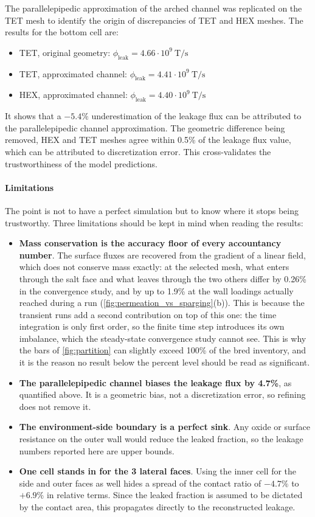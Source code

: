 \documentclass[a4paper,11pt,oneside]{report}
\begin{document}
The parallelepipedic approximation of the arched channel was replicated on the TET mesh to identify the origin of discrepancies of TET and HEX meshes. The results for the bottom cell are:
\begin{itemize}
    \item TET, original geometry: $\phi_\mathrm{leak}=4.66 \cdot10^9 \ \mathrm{T/s}$
    \item TET, approximated channel: $\phi_\mathrm{leak}=4.41 \cdot10^9 \ \mathrm{T/s}$
    \item HEX, approximated channel: $\phi_\mathrm{leak}=4.40 \cdot10^9 \ \mathrm{T/s}$
\end{itemize}
It shows that a $-5.4\%$ underestimation of the leakage flux can be attributed to the parallelepipedic channel approximation. The geometric difference being removed, HEX and TET meshes agree within 0.5\% of the leakage flux value, which can be attributed to discretization error. This cross-validates the trustworthiness of the model predictions.

\paragraph{Limitations}

The point is not to have a perfect simulation but to know where it stops being trustworthy. Three limitations should be kept in mind when reading the results:
\begin{itemize}
    \item \textbf{Mass conservation is the accuracy floor of every accountancy number}. The surface fluxes are recovered from the gradient of a linear field, which does not conserve mass exactly: at the selected mesh, what enters through the salt face and what leaves through the two others differ by 0.26\% in the convergence study, and by up to 1.9\% at the wall loadings actually reached during a run (\cref{fig:permeation_vs_sparging}(b)). This is because the transient runs add a second contribution on top of this one: the time integration is only first order, so the finite time step introduces its own imbalance, which the steady-state convergence study cannot see. This is why the bars of \cref{fig:partition} can slightly exceed 100\% of the bred inventory, and it is the reason no result below the percent level should be read as significant.
    \item \textbf{The parallelepipedic channel biases the leakage flux by 4.7\%}, as quantified above. It is a geometric bias, not a discretization error, so refining does not remove it.
    \item \textbf{The environment-side boundary is a perfect sink}. Any oxide or surface resistance on the outer wall would reduce the leaked fraction, so the leakage numbers reported here are upper bounds.
    \item \textbf{One cell stands in for the 3 lateral faces}. Using the inner cell for the side and outer faces as well hides a spread of the contact ratio of $-4.7\%$ to $+6.9\%$ in relative terms. Since the leaked fraction is assumed to be dictated by the contact area, this propagates directly to the reconstructed leakage.
\end{itemize}
\end{document}
